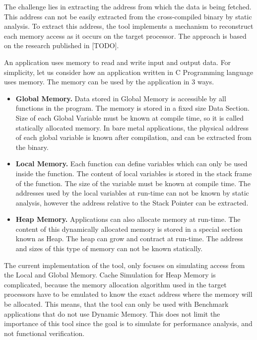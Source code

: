 The challenge lies in extracting the address from which the data is being fetched. This address can not be easily extracted from the cross-compiled binary by static analysis. To extract this address, the tool implements a mechanism to reconstruct each memory access as it occurs on the target processor. The approach is based on the research published in [TODO].

An application uses memory to read and write input and output data. For simplicity, let us consider how an application written in C Programming language uses memory. The memory can be used by the application in 3 ways. 

\begin{itemize} \itemsep -6pt
\item \textbf{Global Memory.} Data stored in Global Memory is accessible by all functions in the program. The memory is stored in a fixed size Data Section. Size of each Global Variable must be known at compile time, so it is called statically allocated memory. In bare metal applications, the physical address of each global variable is known after compilation, and can be extracted from the binary.
\item \textbf{Local Memory.} Each function can define variables which can only be used inside the function. The content of local variables is stored in the stack frame of the function. The size of the variable must be known at compile time. The addresses used by the local variables at run-time can not be known by static analysis, however the address relative to the Stack Pointer can be extracted.
\item \textbf{Heap Memory.} Applications can also allocate memory at run-time. The content of this dynamically allocated memory is stored in a special section known as Heap. The heap can grow and contract at run-time. The address and sizes of this type of memory can not be known statically. 
\end{itemize}

The current implementation of the tool, only focuses on simulating access from the Local and Global Memory. Cache Simulation for Heap Memory is complicated, because the memory allocation algorithm used in the target processors have to be emulated to know the exact address where the memory will be allocated. This means, that the tool can only be used with Benchmark applications that do not use Dynamic Memory. This does not limit the importance of this tool since the goal is to simulate for performance analysis, and not functional verification. %

